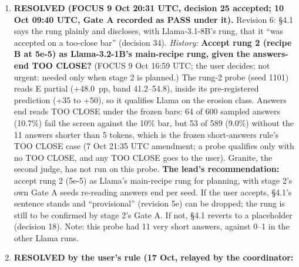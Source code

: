 \documentclass{article}
\theoremstyle{plain}
\theoremstyle{definition}
\theoremstyle{remark}
\begin{document}
\begin{enumerate}
        human check'' (FOCUS 8 Oct 15:59 UTC, item 4); the one-reader
        development read (Appendix A) does not meet it as a confirmatory measure
        (not costed). Decide whether one is planned on stage-1 arms.
        \textbf{Revision 6b:} both reviews ask for it. Review A W6: two
        independent non-author raters, blind to arm and judge label, with
        adjudication and $\kappa$; about 130 judge-Unsafe answers per arm group
        (a0, removals, additions) and about 150 judge-Safe answers;
        misclassification-corrected contrasts as a sensitivity; it disagrees
        with ``not planned'', citing risk 13 (the judge's false-Unsafe rate
        moves with fine-tuning). Review B W6: two raters who did not design the
        study, about 200 answers stratified by arm, Cohen's $\kappa$. Still
        open; not in the body (risk 39).
  \item \textbf{RESOLVED (FOCUS 9 Oct 20:31 UTC, decision 25 accepted; 10 Oct
        09:40 UTC, Gate A recorded as PASS under it).} Revision 6: \S{}4.1 says
        the rung plainly and discloses, with Llama-3.1-8B's rung, that it ``was
        accepted on a too-close bar'' (decision 34). \emph{History:}
        \textbf{Accept rung 2 (recipe B at 5e-5) as Llama-3.2-1B's main-recipe
        rung, given the answers-end TOO CLOSE?} (FOCUS 9 Oct 16:59 UTC; the user
        decides; not urgent: needed only when stage 2 is planned.) The rung-2
        probe (seed 1101) reads E partial (+48.0~pp, band 41.2--54.8), inside
        its pre-registered prediction (+35 to +50), so it qualifies Llama on the
        erosion class. Answers end reads TOO CLOSE under the frozen bars: 64 of
        600 sampled answers (10.7\%) fail the screen against the 10\% bar, but
        53 of 589 (9.0\%) without the 11 answers shorter than 5 tokens, which is
        the frozen short-answers rule's TOO CLOSE case (7 Oct 21:35 UTC
        amendment; a probe qualifies only with no TOO CLOSE, and any TOO CLOSE
        goes to the user). Granite, the second judge, has not run on this probe.
        \textbf{The lead's recommendation:} accept rung 2 (5e-5) as Llama's
        main-recipe rung for planning, with stage 2's own Gate A seeds
        re-reading answers end per seed. If the user accepts, \S{}4.1's sentence
        stands and ``provisional'' (revision 5e) can be dropped; the rung is
        still to be confirmed by stage 2's Gate A. If not, \S{}4.1 reverts to a
        placeholder (decision 18). Note: this probe had 11 very short answers,
        against 0--1 in the other Llama runs.
  \item \textbf{RESOLVED by the user's rule (17 Oct, relayed by the coordinator:
}
\end{enumerate}
\end{document}
